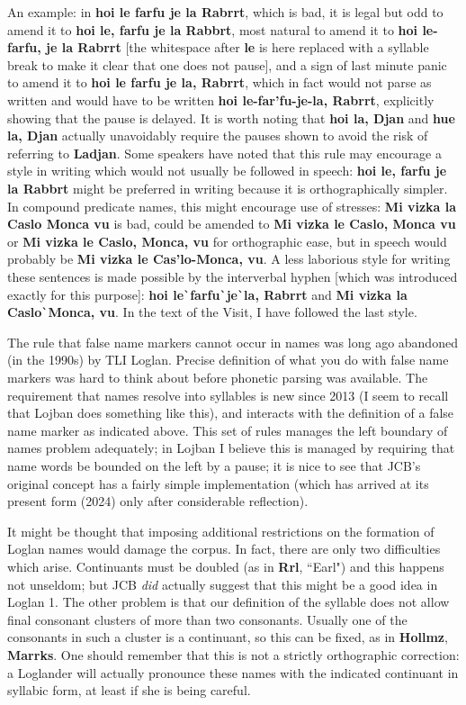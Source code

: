 \documentclass[12pt]{book}
\begin{document}
An example:  in {\bf hoi le farfu je la Rabrrt}, which is bad, it is legal but odd to amend it to {\bf hoi le, farfu je la Rabbrt}, most natural to amend it to {\bf hoi le-farfu, je la Rabrrt} [the whitespace after {\bf le} is here replaced with a syllable break to make it clear that one does not pause], and a sign of last minute panic to amend it to {\bf hoi le farfu je la, Rabrrt}, which in fact would not parse as written and would have to be written
{\bf hoi le-far'fu-je-la, Rabrrt}, explicitly showing that the pause is delayed.  It is worth noting that {\bf hoi la, Djan} and {\bf hue la, Djan} actually unavoidably require the pauses shown to avoid the risk of referring to {\bf Ladjan}.   Some speakers have noted that this rule may encourage a style in writing which would not usually be followed in speech:  {\bf hoi le, farfu je la Rabbrt} might be preferred in writing because it is orthographically simpler.  In compound predicate names, this might encourage use of stresses:  {\bf Mi vizka la Caslo Monca vu} is bad, could be amended to {\bf Mi vizka le Caslo, Monca vu} or {\bf Mi vizka le Caslo, Monca, vu} for orthographic ease, but in speech would probably be {\bf Mi vizka le Cas'lo-Monca, vu}.    A less laborious style for writing these sentences is made possible by the interverbal hyphen [which was introduced exactly for this purpose]:  {\bf hoi le\verb|`|farfu\verb|`|je\verb|`|la, Rabrrt} and {\bf Mi vizka la Caslo\verb|`|Monca, vu}.  In the text of the Visit, I have followed the last style.

The rule that false name markers cannot occur in names was long ago abandoned (in the 1990s) by TLI Loglan.  Precise definition of what you do with false name markers was hard to think about before phonetic parsing was available.  The requirement that names resolve into syllables is new since 2013 (I seem to recall that Lojban does something like this), and interacts with the definition of a false name marker as indicated above.    This set of rules manages the left boundary of names problem adequately;  in Lojban I believe this is managed by requiring that name words be bounded on the left by a pause;  it is nice to see that JCB's original concept
has a fairly simple implementation (which has arrived at its present form (2024) only after considerable reflection).

It might be thought that imposing additional restrictions on the formation of Loglan names would damage the corpus.  In fact, there are only two difficulties which arise.  Continuants must be doubled (as in {\bf Rrl}, ``Earl") and this happens not unseldom;  but JCB {\em did\/} actually suggest that this might be a good idea in Loglan 1.  The other problem is that our definition of the syllable does not allow final consonant clusters of more than two consonants.  Usually one of the consonants in such a cluster is a continuant, so this can be fixed, as in {\bf Hollmz}, {\bf Marrks}.  One should remember that this is not a strictly orthographic correction:  a Loglander will actually pronounce these names with the indicated continuant in syllabic form, at least if she is being careful.
\end{document}
